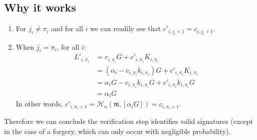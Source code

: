 \subsection*{Why it works}


\begin{enumerate}
	\item For \(j_i \ne \pi_i\) and for all \(i\) we can readily see that \(c'_{i, j_i+1} = c_{i, j_i+1}\).
	
	\item When \(j_i = \pi_i\), for all \(i \):
	\begin{align*}
	L'_{i, \pi_i} &= r_{i, \pi_i} G + c'_{i, \pi_i} K_{i, \pi_i} \\
	              &= (\alpha_i - c_{i, \pi_i} k_{i, \pi_i}) G + c'_{i, \pi_i} K_{i, \pi_i} \\
	              &= \alpha_i G - c_{i, \pi_{i}} k_{i, \pi_i} G + c'_{i, \pi_i} k_{i, \pi_i} G \\
	              &= \alpha_i G 
	\end{align*}
	In other words, \(c'_{i, \pi_i+1} = \mathcal{H}_n(\mathfrak{m}, [\alpha_i G]) = c_{i, \pi_i+1}\).
	
\end{enumerate}

Therefore we can conclude the verification step identifies valid signatures (except in the case of a forgery, which can only occur with negligible probability).

